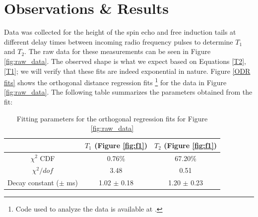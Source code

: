 \documentclass[a4paper, 12pt]{article}  %
\begin{document}



\section{Observations \& Results}\label{results}

Data was collected for the height of the spin echo and free induction tails at different delay times between incoming radio frequency pulses to determine $T_1$ and $T_2$. The raw data for these measurements can be seen in Figure \ref{fig:raw_data}. The observed shape is what we expect based on Equations \ref{T2}, \ref{T1}; we will verify that these fits are indeed exponential in nature. Figure \ref{ODR fits} shows the orthogonal distance regression fits \footnote{Code used to analyze the data is available at \cite{ODR}.} for the data in Figure \ref{fig:raw_data}. The following table summarizes the parameters obtained from the fit:

\begin{table}[htb]
    \centering
    \begin{tabular}{|c|c|c|}
    \hline
         & $T_1$ (Figure \ref{fig:f1}) & $T_2$ (Figure \ref{fig:f1})\\
        \hline
        $\chi^2$ CDF & 0.76\% & 67.20\% \\
        
        $\chi^2 / dof$ & 3.48 & 0.51  \\
        
        Decay constant ($\pm$ ms) & 1.02 $\pm$ 0.18 & 1.20 $\pm$ 0.23          \\
        \hline
    \end{tabular}
    \caption{Fitting parameters for the orthogonal regression fits for Figure \ref{fig:raw_data}}
    \label{tab:fit_parameters}
\end{table}
\end{document}
